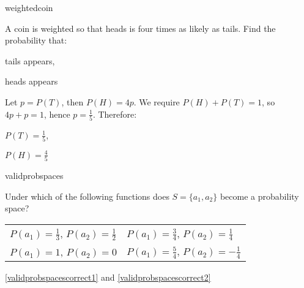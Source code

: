 \begin{defproblem}{weightedcoin}
\begin{onlyproblem}%
A coin is weighted so that heads is four times as likely
as tails. Find the probability that:
\begin{textenum}
\item tails appears,
\item heads appears
\end{textenum}
\end{onlyproblem}
\begin{onlysolution}%
Let $p=P(T)$, then $P(H)=4p$. We require $P(H)+P(T)=1$,
so $4p+p=1$, hence $p=\frac{1}{5}$. Therefore:
\begin{textenum}
\item $P(T)=\frac{1}{5}$,
\item $P(H)=\frac{4}{5}$
\end{textenum}
\end{onlysolution}
\end{defproblem}

\begin{defproblem}{validprobspaces}
\begin{onlyproblem}%
Under which of the following functions does 
$S=\{a_1,a_2\}$ become a probability space?
\par
\begin{textenum}
\begin{tabular}{ll}
\item $P(a_1)=\frac{1}{3}$, $P(a_2)=\frac{1}{2}$
&
\item\label{validprobspacescorrect1} $P(a_1)=\frac{3}{4}$, $P(a_2)=\frac{1}{4}$
\\
\item\label{validprobspacescorrect2} $P(a_1)=1$, $P(a_2)=0$
&
\item $P(a_1)=\frac{5}{4}$, $P(a_2)=-\frac{1}{4}$
\end{tabular}
\end{textenum}
\end{onlyproblem}%
\begin{onlysolution}%
\ref{validprobspacescorrect1} and \ref{validprobspacescorrect2}%
\end{onlysolution}
\end{defproblem}

